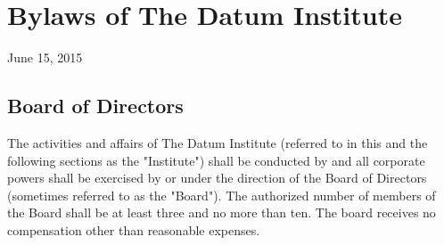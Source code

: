 \textit{}\section{Bylaws of The Datum Institute}

June 15, 2015

\subsection{Board of Directors}

The activities and affairs of The Datum Institute (referred to in this and the following sections as the "Institute") shall be conducted by and all corporate powers shall be exercised by or under the direction of the Board of Directors (sometimes referred to as the "Board"). The authorized number of members of the Board shall be at least three and no more than ten. The board receives no compensation other than reasonable expenses. 

